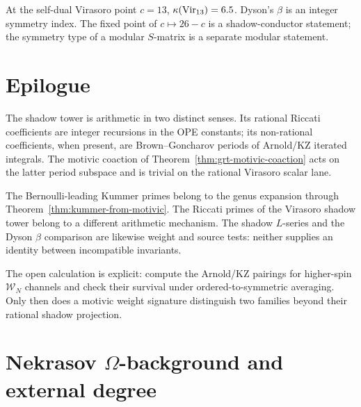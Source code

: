 \begin{remark}
At the self-dual Virasoro point $c=13$, $\kappa(\mathrm{Vir}_{13})=6.5$.
Dyson's $\beta$ is an integer symmetry index. The fixed point of
$c\mapsto26-c$ is a shadow-conductor statement; the symmetry type of a
modular $S$-matrix is a separate modular statement.
\end{remark}

\section{Epilogue}
\label{sec:epilogue}

The shadow tower is arithmetic in two distinct senses. Its rational
Riccati coefficients are integer recursions in the OPE constants; its
non-rational coefficients, when present, are Brown--Goncharov periods
of Arnold/KZ iterated integrals. The motivic coaction of
Theorem~\ref{thm:grt-motivic-coaction} acts on the latter period
subspace and is trivial on the rational Virasoro scalar lane.

The Bernoulli-leading Kummer primes belong to the genus expansion
through Theorem~\ref{thm:kummer-from-motivic}. The Riccati primes of
the Virasoro shadow tower belong to a different arithmetic mechanism.
The shadow $L$-series and the Dyson $\beta$ comparison are likewise
weight and source tests: neither supplies an identity between
incompatible invariants.

The open calculation is explicit: compute the Arnold/KZ pairings for
higher-spin $\mathcal W_N$ channels and check their survival under
ordered-to-symmetric averaging. Only then does a motivic weight
signature distinguish two families beyond their rational shadow
projection.

\section{Nekrasov $\Omega$-background and external degree}
\label{sec:nekrasov-omega-motivic}

\providecommand{\ep}{\epsilon}

